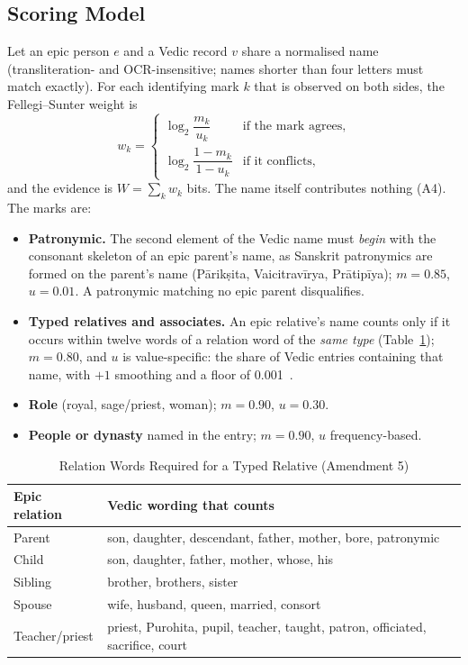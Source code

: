 \documentclass[journal]{IEEEtran}
\begin{document}
\subsection{Scoring Model}
Let an epic person $e$ and a Vedic record $v$ share a normalised name (transliteration- and OCR-insensitive; names
shorter than four letters must match exactly). For each identifying mark $k$ that is observed on both sides, the
Fellegi--Sunter weight is
\begin{equation}
w_k=\begin{cases}\log_2 \dfrac{m_k}{u_k} & \text{if the mark agrees,}\\[2mm]
\log_2 \dfrac{1-m_k}{1-u_k} & \text{if it conflicts,}\end{cases}
\end{equation}
and the evidence is $W=\sum_k w_k$ bits. The name itself contributes nothing (A4). The marks are:

\begin{itemize}
\item \textbf{Patronymic.} The second element of the Vedic name must \emph{begin} with the consonant skeleton of an
epic parent's name, as Sanskrit patronymics are formed on the parent's name (Pārikṣita, Vaicitravīrya, Prātipīya);
$m=0.85$, $u=0.01$. A patronymic matching no epic parent disqualifies.
\item \textbf{Typed relatives and associates.} An epic relative's name counts only if it occurs within twelve words of a
relation word of the \emph{same type} (Table~\ref{tab:relwords}); $m=0.80$, and $u$ is value-specific: the share of
Vedic entries containing that name, with $+1$ smoothing and a floor of 0.001~\cite{fellegi1969}.
\item \textbf{Role} (royal, sage/priest, woman); $m=0.90$, $u=0.30$.
\item \textbf{People or dynasty} named in the entry; $m=0.90$, $u$ frequency-based.
\end{itemize}

\begin{table}[!t]
\caption{Relation Words Required for a Typed Relative (Amendment 5)}
\label{tab:relwords}
\centering\footnotesize
\begin{tabularx}{\columnwidth}{@{}lX@{}}
\toprule
Epic relation & Vedic wording that counts \\
\midrule
Parent & son, daughter, descendant, father, mother, bore, patronymic \\
Child & son, daughter, father, mother, whose, his \\
Sibling & brother, brothers, sister \\
Spouse & wife, husband, queen, married, consort \\
Teacher/priest & priest, Purohita, pupil, teacher, taught, patron, officiated, sacrifice, court \\
\bottomrule
\end{tabularx}
\end{table}
\end{document}
